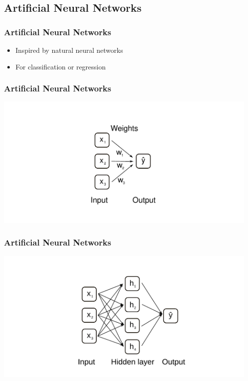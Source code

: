\documentclass[aspectratio=169]{beamer}
\begin{document}
\subsection{Artificial Neural Networks}

\setcounter{tocdepth}{2}
\begin{frame}{}
   \tableofcontents[currentsubsection]
\end{frame}


\begin{frame}
  \begin{block}{}
    \begin{center}
      \frametitle{Artificial Neural Networks}
      \begin{itemize}
      \item Inspired by natural neural networks
      \item For classification or regression
      \end{itemize}
    \end{center}  
  \end{block}  
\end{frame}


\begin{frame}
  \frametitle{Artificial Neural Networks}
  \begin{center}    
    \includegraphics[width=13.0cm]{images/ANN_without_hidden_layer.pdf}
  \end{center}  
\end{frame}

\begin{frame}
  \frametitle{Artificial Neural Networks}
  \begin{center}
    \includegraphics[width=13.0cm]{images/ANN_with_hidden_layer.pdf}
  \end{center}  
\end{frame}
\end{document}

